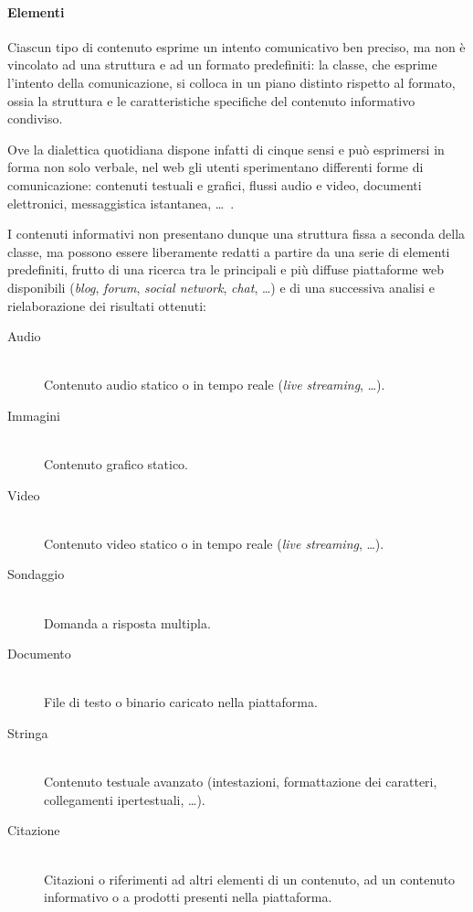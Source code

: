 \paragraph{Elementi}
Ciascun tipo di contenuto esprime un intento comunicativo ben preciso, ma non è vincolato ad una struttura e ad un formato predefiniti: la classe, che esprime l'intento della comunicazione, si colloca in un piano distinto rispetto al formato, ossia la struttura e le caratteristiche specifiche del contenuto informativo condiviso.

Ove la dialettica quotidiana dispone infatti di cinque sensi e può esprimersi in forma non solo verbale, nel web gli utenti sperimentano differenti forme di comunicazione: contenuti testuali e grafici, flussi audio e video, documenti elettronici, messaggistica istantanea, \ldots\ .

I contenuti informativi non presentano dunque una struttura fissa a seconda della classe, ma possono essere liberamente redatti a partire da una serie di elementi predefiniti, frutto di una ricerca tra le principali e più diffuse piattaforme web disponibili (\textit{blog}, \textit{forum}, \textit{social network}, \textit{chat}, \ldots) e di una successiva analisi e rielaborazione dei risultati ottenuti:
\begin{description}
\item[Audio] \hfill \\
Contenuto audio statico o in tempo reale (\textit{live streaming}, \ldots).
\item[Immagini] \hfill \\
Contenuto grafico statico.
\item[Video] \hfill \\
Contenuto video statico o in tempo reale (\textit{live streaming}, \ldots).
\item[Sondaggio] \hfill \\
Domanda a risposta multipla.
\item[Documento] \hfill \\
File di testo o binario caricato nella piattaforma.
\item[Stringa] \hfill \\
Contenuto testuale avanzato (intestazioni, formattazione dei caratteri, collegamenti ipertestuali, \ldots).
\item[Citazione] \hfill \\
Citazioni o riferimenti ad altri elementi di un contenuto, ad un contenuto informativo o a prodotti presenti nella piattaforma. 
\end{description}


